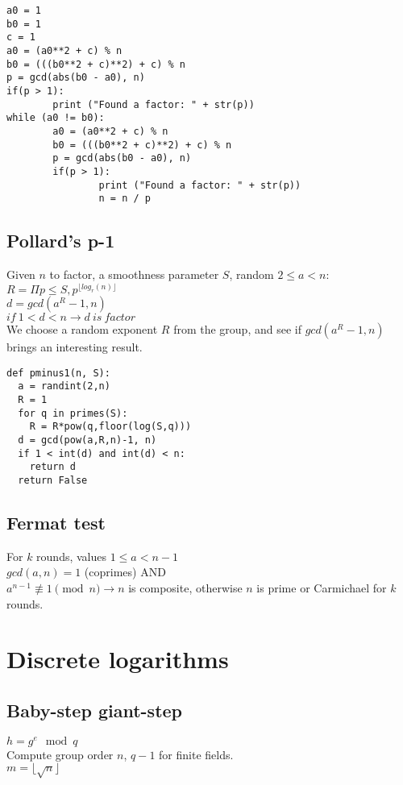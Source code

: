 \documentclass{article}
\begin{document}
\begin{verbatim}
a0 = 1
b0 = 1
c = 1
a0 = (a0**2 + c) % n
b0 = (((b0**2 + c)**2) + c) % n
p = gcd(abs(b0 - a0), n)
if(p > 1):
        print ("Found a factor: " + str(p))
while (a0 != b0):
        a0 = (a0**2 + c) % n
        b0 = (((b0**2 + c)**2) + c) % n
        p = gcd(abs(b0 - a0), n)
        if(p > 1):
                print ("Found a factor: " + str(p))
                n = n / p
\end{verbatim}

\subsection{Pollard's p-1}
Given $n$ to factor, a smoothness parameter $S$, random $2 \leq a < n$: \\
$R = \Pi p \leq S, p^{\lfloor log_r(n) \rfloor}$ \\
$d = gcd(a^R-1, n)$ \\
$if~1 < d < n \rightarrow d~is~factor$ \\

We choose a random exponent $R$ from the group, and see if $gcd(a^R -1, n)$
brings an interesting result.

\begin{verbatim}
def pminus1(n, S):
  a = randint(2,n)
  R = 1
  for q in primes(S):
    R = R*pow(q,floor(log(S,q)))
  d = gcd(pow(a,R,n)-1, n)
  if 1 < int(d) and int(d) < n:
    return d
  return False
\end{verbatim}

\subsection{Fermat test}
For $k$ rounds, values $1 \leq a < n-1$ \\
$gcd(a,n) = 1$ (coprimes) AND \\
$a^{n-1} \not\equiv 1 \pmod n \rightarrow n$ is composite,
otherwise $n$ is prime or Carmichael for $k$ rounds. \\

\section{Discrete logarithms}
\subsection{Baby-step giant-step}
$h = g^e \mod q$ \\
Compute group order $n$, $q-1$ for finite fields. \\
$m = \lfloor \sqrt{n} \rfloor$\\
\end{document}
